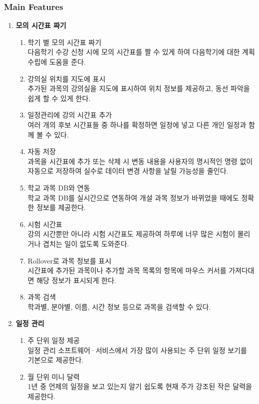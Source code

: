 \documentclass[a4paper,titlepage]{article}
\begin{document}
\subsubsection{Main Features}
\begin{enumerate}
	\item\textbf{모의 시간표 짜기}
	\begin{enumerate}
		\item 학기 별 모의 시간표 짜기\\
		다음학기 수강 신청 시에 모의 시간표를 짤 수 있게 하여 다음학기에 대한 계획 수립에 도움을 준다. 
		\item 강의실 위치를 지도에 표시\\
		추가된 과목의 강의실을 지도에 표시하여 위치 정보를 제공하고, 동선 파악을 쉽게 할 수 있게 한다. 
		\item 일정관리에 강의 시간표 추가\\
		여러 개의 후보 시간표들 중 하나를 확정하면 일정에 넣고 다른 개인 일정과 함께 볼 수 있다. 
		\item 자동 저장\\
		과목을 시간표에 추가 또는 삭제 시 변동 내용을 사용자의 명시적인 명령 없이 자동으로 저장하여 실수로 데이터 변경 사항을 날릴 가능성을 줄인다. 
		\item 학교 과목 DB와 연동\\
		학교 과목 DB를 실시간으로 연동하여 개설 과목 정보가 바뀌었을 때에도 정확한 정보를 제공한다. 
		\item 시험 시간표\\
		강의 시간뿐만 아니라 시험 시간표도 제공하여 하루에 너무 많은 시험이 몰리거나 겹치는 일이 없도록 도와준다. 
		\item Rollover로 과목 정보를 표시\\
		시간표에 추가된 과목이나 추가할 과목 목록의 항목에 마우스 커서를 가져다대면 해당 정보가 표시되게 한다.
		\item 과목 검색\\
		학과별, 분야별, 이름, 시간 정보 등으로 과목을 검색할 수 있다.
	\end{enumerate}
	\item\textbf{일정 관리}
	\begin{enumerate}
		\item 주 단위 일정 제공\\
		일정 관리 소프트웨어·서비스에서 가장 많이 사용되는 주 단위 일정 보기를 기본으로 제공한다. 
		\item 월 단위 미니 달력\\
		1년 중 언제의 일정을 보고 있는지 알기 쉽도록 현재 주가 강조된 작은 달력을 제공한다.

\end{enumerate}
\end{enumerate}
\end{document}
